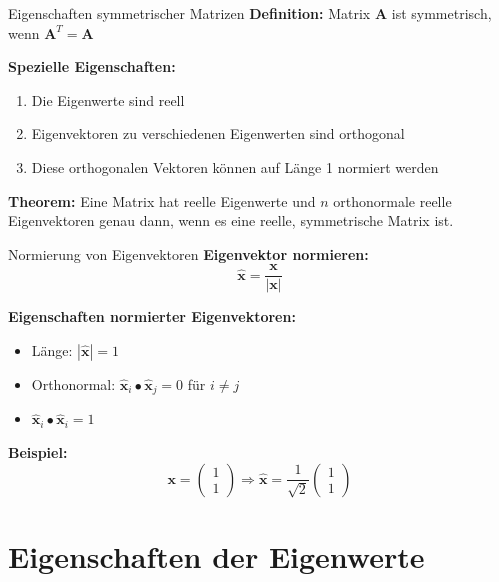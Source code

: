 \documentclass[a4paper, fontsize=7pt]{scrartcl}
\begin{document}
\begin{mainbox}{Eigenschaften symmetrischer Matrizen}
\textbf{Definition:} Matrix $\mathbf{A}$ ist symmetrisch, wenn $\mathbf{A}^T = \mathbf{A}$

\textbf{Spezielle Eigenschaften:}
\begin{enumerate}
    \item Die Eigenwerte sind reell
    \item Eigenvektoren zu verschiedenen Eigenwerten sind orthogonal
    \item Diese orthogonalen Vektoren können auf Länge 1 normiert werden
\end{enumerate}

\textbf{Theorem:}
Eine Matrix hat reelle Eigenwerte und $n$ orthonormale reelle Eigenvektoren genau dann, wenn es eine reelle, symmetrische Matrix ist.
\end{mainbox}

\begin{mainbox}{Normierung von Eigenvektoren}
\textbf{Eigenvektor normieren:}
$$\hat{\mathbf{x}} = \frac{\mathbf{x}}{|\mathbf{x}|}$$

\textbf{Eigenschaften normierter Eigenvektoren:}
\begin{itemize}
    \item Länge: $|\hat{\mathbf{x}}| = 1$
    \item Orthonormal: $\hat{\mathbf{x}}_i \bullet \hat{\mathbf{x}}_j = 0$ für $i \neq j$
    \item $\hat{\mathbf{x}}_i \bullet \hat{\mathbf{x}}_i = 1$
\end{itemize}

\textbf{Beispiel:}
$$\mathbf{x} = \begin{pmatrix} 1 \\ 1 \end{pmatrix} \Rightarrow \hat{\mathbf{x}} = \frac{1}{\sqrt{2}}\begin{pmatrix} 1 \\ 1 \end{pmatrix}$$
\end{mainbox}

\section{Eigenschaften der Eigenwerte}
\end{document}
